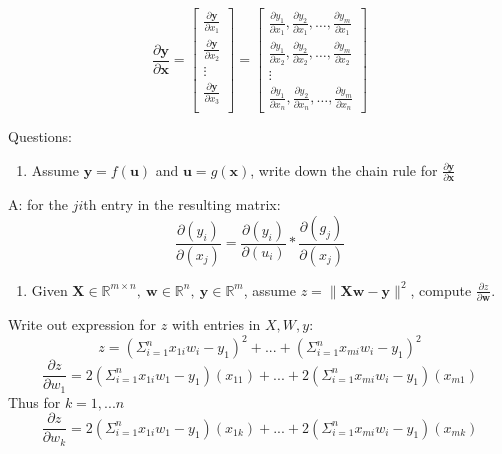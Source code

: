 \documentclass[11pt]{article}
\providecommand{\tightlist}{%
      \setlength{\itemsep}{0pt}\setlength{\parskip}{0pt}}
\begin{document}
\[
\frac{\partial \mathbf y}{\partial \mathbf{x}}
=\begin{bmatrix}
\frac{\partial \mathbf y}{\partial {x_1}}\\
\frac{\partial \mathbf y}{\partial {x_2}}\\
\vdots\\
\frac{\partial \mathbf y}{\partial {x_3}}\\
\end{bmatrix}
=\begin{bmatrix}
\frac{\partial y_1}{\partial x_1}, 
\frac{\partial y_2}{\partial x_1},
\ldots,
\frac{\partial y_m}{\partial x_1}
\\ 
\frac{\partial y_1}{\partial x_2},
\frac{\partial y_2}{\partial x_2},
\ldots,
\frac{\partial y_m}{\partial x_2}\\ 
\vdots\\
\frac{\partial y_1}{\partial x_n},
\frac{\partial y_2}{\partial x_n},
\ldots,
\frac{\partial y_m}{\partial x_n}
\end{bmatrix}
\]

Questions:

\begin{enumerate}
\def\labelenumi{\arabic{enumi}.}
\tightlist
\item
  Assume \(\mathbf y = f(\mathbf u)\) and \(\mathbf u = g(\mathbf x)\),
  write down the chain rule for
  \(\frac {\partial\mathbf y}{\partial\mathbf x}\)
\end{enumerate}

A: for the \(ji\)th entry in the resulting matrix:
\[\frac {\partial(y_i)}{\partial(x_j)} = \frac {\partial(y_i)}{\partial(u_i)}*\frac {\partial(g_j)}{\partial(x_j)}\]

\begin{enumerate}
\def\labelenumi{\arabic{enumi}.}
\setcounter{enumi}{1}
\tightlist
\item
  Given
  \(\mathbf X \in \mathbb R^{m\times n},\ \mathbf w \in \mathbb R^n, \ \mathbf y \in \mathbb R^m\),
  assume \(z = \| \mathbf X \mathbf w - \mathbf y\|^2\), compute
  \(\frac{\partial z}{\partial\mathbf w}\).
\end{enumerate}

Write out expression for \(z\) with entries in \(X, W, y\):
\[z = (\Sigma_{i=1}^n x_{1i}w_i - y_1)^2 + ... + (\Sigma_{i=1}^n x_{mi}w_i - y_1)^2\]
\[\frac{\partial z}{\partial w_1} = 2(\Sigma_{i=1}^n x_{1i}w_1 - y_1)(x_{11})+...+2(\Sigma_{i=1}^n x_{mi}w_i - y_1)(x_{m1}) \]
Thus for \(k = 1, ... n\)
\[\frac{\partial z}{\partial w_k} = 2(\Sigma_{i=1}^n x_{1i}w_1 - y_1)(x_{1k})+...+2(\Sigma_{i=1}^n x_{mi}w_i - y_1)(x_{mk}) \]
\end{document}

